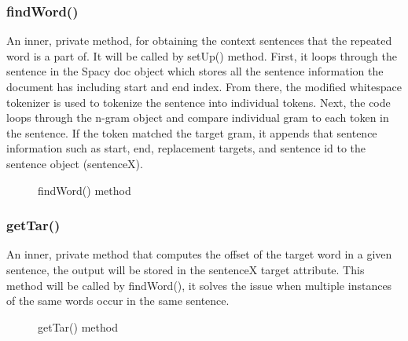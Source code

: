 \documentclass[12pt,oneside,openright,a4paper]{cpe-english-project}
\begin{document}
\subsubsection{ findWord()} 
An inner, private method, for obtaining the context sentences that the repeated word is a part of. It will be called by setUp() method. First, it loops through the sentence in the Spacy doc object which stores all the sentence information the document has including start and end index. From there, the modified whitespace tokenizer is used to tokenize the sentence into individual tokens. Next, the code loops through the n-gram object and compare individual gram to each token in the sentence. If the token matched the target gram, it appends that sentence information such as start, end, replacement targets, and sentence id to the sentence object (sentenceX).
\begin{figure}[!h]\centering
\setlength{\fboxrule}{0.2mm} %
\setlength{\fboxsep}{1cm}
\caption{findWord() method}\label{fig:findWord() method}
\end{figure}
\subsubsection{getTar() }
An inner, private method that computes the offset of the target word in a given sentence, the output will be stored in the sentenceX target attribute. This method will be called by findWord(), it solves the issue when multiple instances of the same words occur in the same sentence.
\begin{figure}[!h]\centering
\setlength{\fboxrule}{0.2mm} %
\setlength{\fboxsep}{1cm}
\caption{getTar() method}\label{fig:getTar() method}
\end{figure}
\end{document}
